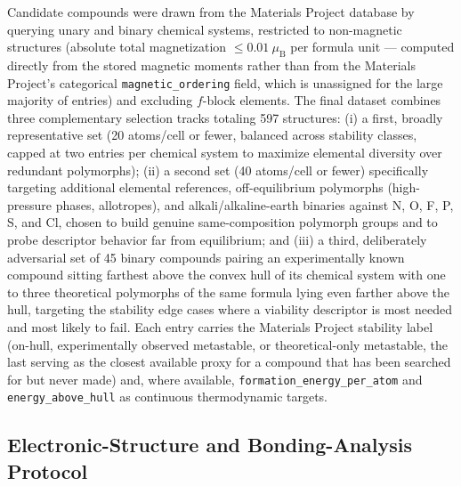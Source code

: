 \documentclass[journal=jpccck,manuscript=article]{achemso}
\begin{document}
Candidate compounds were drawn from the Materials Project
database\cite{jain2013} by querying unary and binary chemical systems,
restricted to non-magnetic structures (absolute total magnetization
$\leq 0.01~\mu_\text{B}$ per formula unit --- computed directly from the
stored magnetic moments rather than from the Materials Project's categorical
\texttt{magnetic\_ordering} field, which is unassigned for the large
majority of entries) and excluding $f$-block elements. The final dataset
combines three complementary selection tracks totaling 597 structures: (i) a
first, broadly representative set (\num{20} atoms/cell or fewer, balanced
across stability classes, capped at two entries per chemical system to
maximize elemental diversity over redundant polymorphs); (ii) a second set
(\num{40} atoms/cell or fewer) specifically targeting additional elemental
references, off-equilibrium polymorphs (high-pressure phases, allotropes),
and alkali/alkaline-earth binaries against N, O, F, P, S, and Cl, chosen to
build genuine same-composition polymorph groups and to probe descriptor
behavior far from equilibrium; and (iii) a third, deliberately adversarial
set of 45 binary compounds pairing an experimentally known compound sitting
farthest above the convex hull of its chemical system with one to three
theoretical polymorphs of the same formula lying even farther above the
hull, targeting the stability edge cases where a viability descriptor is
most needed and most likely to fail. Each entry carries the Materials
Project stability label (on-hull, experimentally observed metastable, or
theoretical-only metastable, the last serving as the closest available
proxy for a compound that has been searched for but never made) and,
where available, \texttt{formation\_energy\_per\_atom} and
\texttt{energy\_above\_hull} as continuous thermodynamic targets.

\subsection{Electronic-Structure and Bonding-Analysis Protocol}
\label{sec:dft-lobster}
\end{document}
